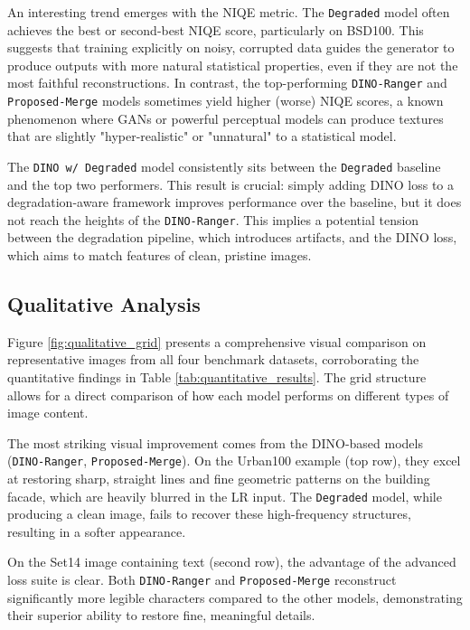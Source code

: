 \documentclass[10pt,twocolumn,letterpaper]{article}
\begin{document}
An interesting trend emerges with the NIQE metric. The \texttt{Degraded} model often achieves the best or second-best NIQE score, particularly on BSD100. This suggests that training explicitly on noisy, corrupted data guides the generator to produce outputs with more natural statistical properties, even if they are not the most faithful reconstructions. In contrast, the top-performing \texttt{DINO-Ranger} and \texttt{Proposed-Merge} models sometimes yield higher (worse) NIQE scores, a known phenomenon where GANs or powerful perceptual models can produce textures that are slightly "hyper-realistic" or "unnatural" to a statistical model.

The \texttt{DINO w/ Degraded} model consistently sits between the \texttt{Degraded} baseline and the top two performers. This result is crucial: simply adding DINO loss to a degradation-aware framework improves performance over the baseline, but it does not reach the heights of the \texttt{DINO-Ranger}. This implies a potential tension between the degradation pipeline, which introduces artifacts, and the DINO loss, which aims to match features of clean, pristine images.

\subsection{Qualitative Analysis}
Figure \ref{fig:qualitative_grid} presents a comprehensive visual comparison on representative images from all four benchmark datasets, corroborating the quantitative findings in Table \ref{tab:quantitative_results}. The grid structure allows for a direct comparison of how each model performs on different types of image content.

The most striking visual improvement comes from the DINO-based models (\texttt{DINO-Ranger}, \texttt{Proposed-Merge}). On the Urban100 example (top row), they excel at restoring sharp, straight lines and fine geometric patterns on the building facade, which are heavily blurred in the LR input. The \texttt{Degraded} model, while producing a clean image, fails to recover these high-frequency structures, resulting in a softer appearance.

On the Set14 image containing text (second row), the advantage of the advanced loss suite is clear. Both \texttt{DINO-Ranger} and \texttt{Proposed-Merge} reconstruct significantly more legible characters compared to the other models, demonstrating their superior ability to restore fine, meaningful details.
\end{document}
